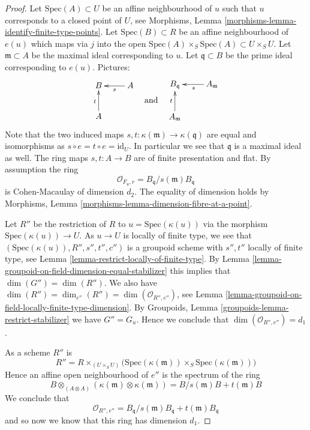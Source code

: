 \begin{proof}
Let $\text{Spec}(A) \subset U$ be an affine neighbourhood of $u$
such that $u$ corresponds to a closed point of $U$, see
Morphisms, Lemma \ref{morphisms-lemma-identify-finite-type-points}.
Let $\text{Spec}(B) \subset R$ be an affine neighbourhood of $e(u)$
which maps via $j$ into the open
$\text{Spec}(A) \times_S \text{Spec}(A) \subset U \times_S U$.
Let $\mathfrak m \subset A$ be the maximal ideal corresponding to $u$.
Let $\mathfrak q \subset B$ be the prime ideal corresponding to $e(u)$.
Pictures:
$$
\vcenter{
\xymatrix{
B & A \ar[l]^s \\
A \ar[u]^t
}
}
\quad\text{and}\quad
\vcenter{
\xymatrix{
B_{\mathfrak q} & A_{\mathfrak m} \ar[l]^s \\
A_{\mathfrak m} \ar[u]^t
}
}
$$
Note that the two induced maps
$s, t : \kappa(\mathfrak m) \to \kappa(\mathfrak q)$
are equal and isomorphisms as $s \circ e = t \circ e = \text{id}_U$.
In particular we see that $\mathfrak q$
is a maximal ideal as well. The ring maps $s, t : A \to B$ are
of finite presentation and flat. By assumption the ring
$$
\mathcal{O}_{F_u, r} = B_{\mathfrak q}/s(\mathfrak m)B_{\mathfrak q}
$$
is Cohen-Macaulay of dimension $d_2$. The equality of dimension holds by
Morphisms, Lemma \ref{morphisms-lemma-dimension-fibre-at-a-point}.

\medskip\noindent
Let $R''$ be the restriction of $R$ to $u = \text{Spec}(\kappa(u))$
via the morphism $\text{Spec}(\kappa(u)) \to U$.
As $u \to U$ is locally of finite type,
we see that $(\text{Spec}(\kappa(u)), R'', s'', t'', c'')$
is a groupoid scheme with $s'', t''$ locally of finite type, see
Lemma \ref{lemma-restrict-locally-of-finite-type}.
By
Lemma \ref{lemma-groupoid-on-field-dimension-equal-stabilizer}
this implies that $\dim(G'') = \dim(R'')$. We also have
$\dim(R'') = \dim_{e''}(R'') = \dim(\mathcal{O}_{R'', e''})$, see
Lemma \ref{lemma-groupoid-on-field-locally-finite-type-dimension}.
By
Groupoids, Lemma \ref{groupoids-lemma-restrict-stabilizer}
we have $G'' = G_u$. Hence we conclude that
$\dim(\mathcal{O}_{R'', e''}) = d_1$.

\medskip\noindent
As a scheme $R''$ is
$$
R'' =
R \times_{(U \times_S U)}
\Big(
\text{Spec}(\kappa(\mathfrak m)) \times_S \text{Spec}(\kappa(\mathfrak m))
\Big)
$$
Hence an affine open neighbourhood of $e''$ is the spectrum of the ring
$$
B \otimes_{(A \otimes A)} (\kappa(\mathfrak m) \otimes \kappa(\mathfrak m))
=
B/s(\mathfrak m)B + t(\mathfrak m)B
$$
We conclude that
$$
\mathcal{O}_{R'', e''} =
B_{\mathfrak q}/s(\mathfrak m)B_{\mathfrak q} + t(\mathfrak m)B_{\mathfrak q}
$$
and so now we know that this ring has dimension $d_1$.


\end{proof}
